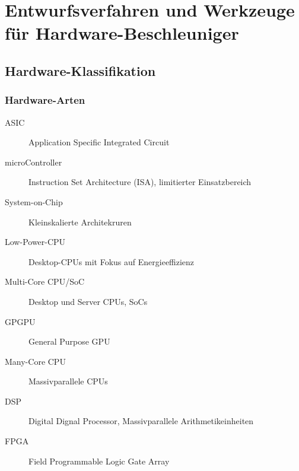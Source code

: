 \chapter{Entwurfsverfahren und Werkzeuge für Hardware-Beschleuniger}
	\section{Hardware-Klassifikation}
		\subsection{Hardware-Arten}
			\begin{description}
				\item[ASIC] Application Specific Integrated Circuit
				\item[microController] Instruction Set Architecture (ISA), limitierter Einsatzbereich
				\item[System-on-Chip] Kleinskalierte Architekruren
				\item[Low-Power-CPU] Desktop-CPUs mit Fokus auf Energieeffizienz
				\item[Multi-Core CPU/SoC] Desktop und Server CPUs, SoCs
				\item[GPGPU] General Purpose GPU
				\item[Many-Core CPU] Massivparallele CPUs
				\item[DSP] Digital Dignal Processor, Massivparallele Arithmetikeinheiten
				\item[FPGA] Field Programmable Logic Gate Array
			\end{description}
		
